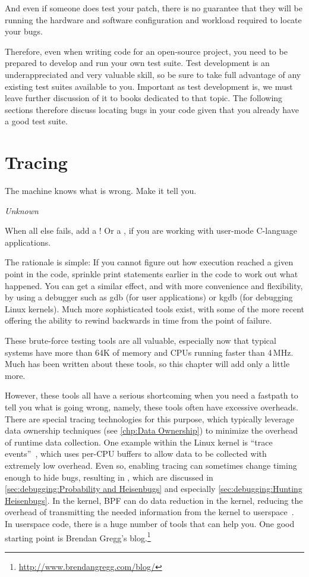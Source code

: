And even if someone does test your patch, there is no guarantee that they
will be running the hardware and software configuration and workload
required to locate your bugs.

Therefore, even when writing code for an open-source project, you need to
be prepared to develop and run your own test suite.
Test development is an underappreciated and very valuable skill, so be
sure to take full advantage of any existing test suites available to
you.
Important as test development is, we must leave further discussion of it
to books dedicated to that topic.
The following sections therefore discuss locating bugs in your code given that
you already have a good test suite.

\section{Tracing}
\label{sec:debugging:Tracing}
%
\epigraph{The machine knows what is wrong.
	  Make it tell you.}{\emph{Unknown}}

When all else fails, add a !
Or a , if you are working with user-mode C-language applications.

The rationale is simple: If you cannot figure out how execution reached
a given point in the code, sprinkle print statements earlier in the
code to work out what happened.
You can get a similar effect, and with more convenience and flexibility,
by using a debugger such as gdb (for user applications) or kgdb
(for debugging Linux kernels).
Much more sophisticated tools exist, with some of the more recent
offering the ability to rewind backwards in time from the point
of failure.

These brute-force testing tools are all valuable, especially now
that typical systems have more than 64K of memory and CPUs running
faster than 4\,MHz.
Much has been
written about these tools, so this chapter will add only a little more.

However, these tools all have a serious shortcoming when you need a
fastpath to tell you what is going wrong, namely, these tools often have
excessive overheads.
There are special tracing technologies for this purpose, which typically
leverage data ownership techniques
(see \cref{chp:Data Ownership})
to minimize the overhead of runtime data collection.
One example within the Linux kernel is
``trace events''~\cite{StevenRostedt2010perfTraceEventP1,StevenRostedt2010perfTraceEventP2,StevenRostedt2010perfTraceEventP3,StevenRostedt2010perfHP+DeathlyMacros},
which uses per-CPU buffers to allow data to be collected with
extremely low overhead.
Even so, enabling tracing can sometimes change timing enough to
hide bugs, resulting in \emph{}, which are discussed in
\cref{sec:debugging:Probability and Heisenbugs}
and especially \cref{sec:debugging:Hunting Heisenbugs}.
In the kernel, BPF can do data reduction in the kernel, reducing
the overhead of transmitting the needed information from the kernel
to userspace~\cite{BrendanGregg2019BPFperftools}.
In userspace code, there is a huge number of tools that can help you.
One good starting point is Brendan Gregg's blog.\footnote{
	\url{http://www.brendangregg.com/blog/}}

